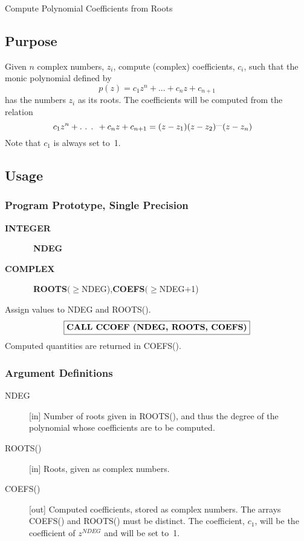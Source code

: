 \documentclass[twoside]{MATH77}
\begin{document}
 Compute Polynomial Coefficients from Roots


\subsection{Purpose}

Given $n$ complex numbers, $z_i$, compute (complex) coefficients, $c_i$,
such that the monic polynomial defined by%
\begin{equation*}
p(z)=c_1z^n+...+c_nz+c_{n+1}
\end{equation*}
has the numbers $z_i$ as its roots. The coefficients will be computed from
the relation%
\begin{equation*}
\hspace{-10pt}c_1z^n+.\text{ . . }+c_nz+c_{n+1}=(z-z_1)(z-z_2)^{...}(z-z_n)
\end{equation*}
Note that $c_1$ is always set to~1.

\subsection{Usage}

\subsubsection{Program Prototype, Single Precision}

\begin{description}
\item[\bf INTEGER]  \ {\bf NDEG}
\item[\bf COMPLEX]  \ {\bf ROOTS}$(\geq $NDEG),{\bf COEFS}$(\geq $NDEG+1)
\end{description}
Assign values to NDEG and ROOTS().
$$
\fbox{{\bf CALL CCOEF (NDEG, ROOTS, COEFS)}}
$$
Computed quantities are returned in COEFS().

\subsubsection{Argument Definitions}

\begin{description}
\item[NDEG]  [in] Number of roots given in ROOTS(), and thus the degree of
the polynomial whose coefficients are to be computed.
\item[ROOTS()]  [in] Roots, given as complex numbers.
\item[COEFS()]  [out] Computed coefficients, stored as complex numbers. The
arrays COEFS() and ROOTS() must be distinct. The coefficient, $c_1$, will be
the coefficient of $z^{NDEG}$ and will be set to~1.
\end{description}
\end{document}
